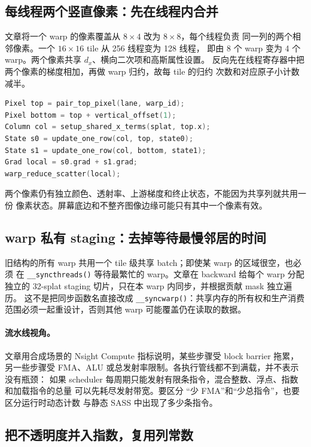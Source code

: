 \subsection{每线程两个竖直像素：先在线程内合并}

文章将一个 warp 的像素覆盖从 $8\times4$ 改为 $8\times8$，每个线程负责
同一列的两个相邻像素。一个 $16\times16$ tile 从 256 线程变为 128 线程，
即由 8 个 warp 变为 4 个 warp。两个像素共享 $d_x$、横向二次项和高斯属性设置。
反向先在线程寄存器中把两个像素的梯度相加，再做 warp 归约，故每 tile 的归约
次数和对应原子小计数减半。

\begin{lstlisting}[language=C++,basicstyle=\ttfamily\small,breaklines=true]
Pixel top = pair_top_pixel(lane, warp_id);
Pixel bottom = top + vertical_offset(1);
Column col = setup_shared_x_terms(splat, top.x);
State s0 = update_one_row(col, top, state0);
State s1 = update_one_row(col, bottom, state1);
Grad local = s0.grad + s1.grad;
warp_reduce_scatter(local);
\end{lstlisting}

两个像素仍有独立颜色、透射率、上游梯度和终止状态，不能因为共享列就共用一份
像素状态。屏幕底边和不整齐图像边缘可能只有其中一个像素有效。

\subsection{warp 私有 staging：去掉等待最慢邻居的时间}

旧结构的所有 warp 共用一个 tile 级共享 batch；即使某 warp 的区域很空，也必须
在 \texttt{\_\_syncthreads()} 等待最繁忙的 warp。文章在 backward 给每个 warp
分配独立的 32-splat staging 切片，只在本 warp 内同步，并根据贡献 mask 独立遍历。
这不是把同步函数名直接改成 \texttt{\_\_syncwarp()}：共享内存的所有权和生产消费
范围必须一起重设计，否则其他 warp 可能覆盖仍在读取的数据。

\paragraph{流水线视角。}
文章用合成场景的 Nsight Compute 指标说明，某些步骤受 block barrier 拖累，
另一些步骤受 FMA、ALU 或总发射率限制。各执行管线都不到满载，并不表示没有瓶颈：
如果 scheduler 每周期只能发射有限条指令，混合整数、浮点、指数和加载指令的总量
可以先耗尽发射带宽。要区分 ``少 FMA''和``少总指令''，也要区分运行时动态计数
与静态 SASS 中出现了多少条指令。

\subsection{把不透明度并入指数，复用列常数}

